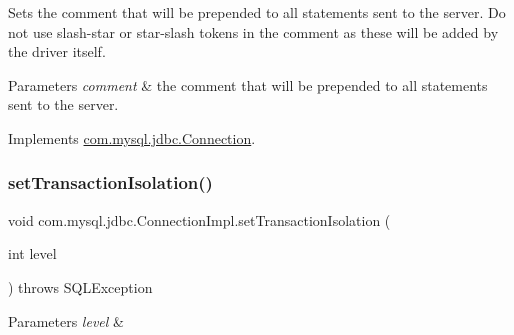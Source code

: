 Sets the comment that will be prepended to all statements sent to the server. Do not use slash-\/star or star-\/slash tokens in the comment as these will be added by the driver itself.


\begin{DoxyParams}{Parameters}
{\em comment} & the comment that will be prepended to all statements sent to the server. \\
\hline
\end{DoxyParams}


Implements \mbox{\hyperlink{interfacecom_1_1mysql_1_1jdbc_1_1_connection_a94f38f8f7d8afd2a7bf6c87ad0d5d422}{com.\+mysql.\+jdbc.\+Connection}}.

\mbox{\label{classcom_1_1mysql_1_1jdbc_1_1_connection_impl_afdba9c661537b2fddb5e4987f5b5538f}} 
\subsubsection{\texorpdfstring{set\+Transaction\+Isolation()}{setTransactionIsolation()}}
{\footnotesize\ttfamily void com.\+mysql.\+jdbc.\+Connection\+Impl.\+set\+Transaction\+Isolation (\begin{DoxyParamCaption}\item[{int}]{level }\end{DoxyParamCaption}) throws S\+Q\+L\+Exception}


\begin{DoxyParams}{Parameters}
{\em level} & \\
\hline
\end{DoxyParams}

